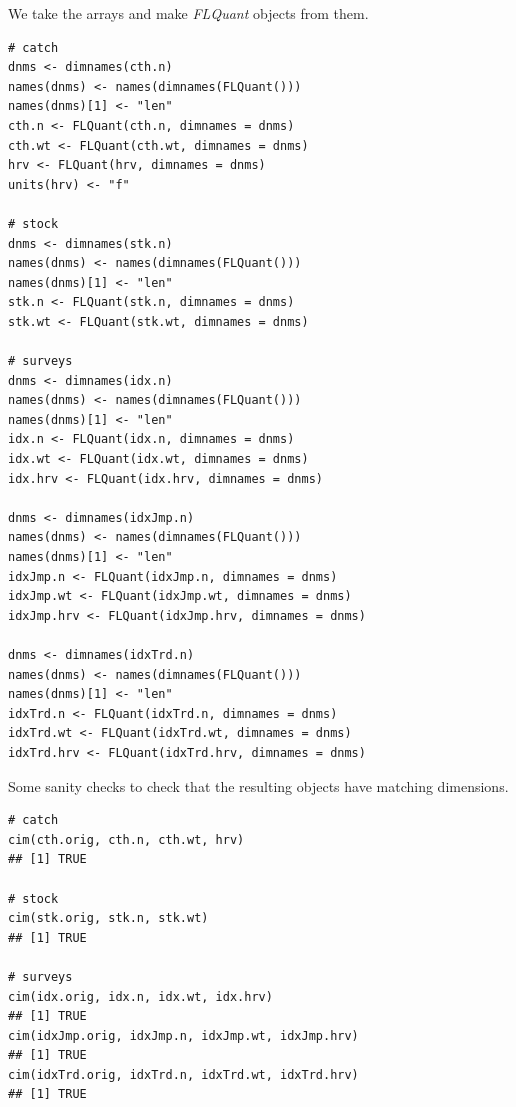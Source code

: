 \documentclass[a4paper,english,10pt]{article}\usepackage[]{graphicx}\usepackage[]{color}
\makeatletter
\newenvironment{kframe}{%
 \def\at@end@of@kframe{}%
 \ifinner\ifhmode%
  \def\at@end@of@kframe{\end{minipage}}%
  \begin{minipage}{\columnwidth}%
 \fi\fi%
 \def\FrameCommand##1{\hskip\@totalleftmargin \hskip-\fboxsep
 \colorbox{shadecolor}{##1}\hskip-\fboxsep
     \hskip-\linewidth \hskip-\@totalleftmargin \hskip\columnwidth}%
 \MakeFramed {\advance\hsize-\width
   \@totalleftmargin\z@ \linewidth\hsize
   \@setminipage}}%
 {\par\unskip\endMakeFramed%
 \at@end@of@kframe}
\newenvironment{knitrout}{}{} %
\newcommand{\class}[1]{{\textit{#1}}}
\makeatother
\begin{document}
We take the arrays and make \class{FLQuant} objects from them.

\begin{knitrout}
\color{fgcolor}\begin{kframe}
\begin{verbatim}
# catch
dnms <- dimnames(cth.n)
names(dnms) <- names(dimnames(FLQuant()))
names(dnms)[1] <- "len"
cth.n <- FLQuant(cth.n, dimnames = dnms)
cth.wt <- FLQuant(cth.wt, dimnames = dnms)
hrv <- FLQuant(hrv, dimnames = dnms)
units(hrv) <- "f"

# stock
dnms <- dimnames(stk.n)
names(dnms) <- names(dimnames(FLQuant()))
names(dnms)[1] <- "len"
stk.n <- FLQuant(stk.n, dimnames = dnms)
stk.wt <- FLQuant(stk.wt, dimnames = dnms)

# surveys
dnms <- dimnames(idx.n)
names(dnms) <- names(dimnames(FLQuant()))
names(dnms)[1] <- "len"
idx.n <- FLQuant(idx.n, dimnames = dnms)
idx.wt <- FLQuant(idx.wt, dimnames = dnms)
idx.hrv <- FLQuant(idx.hrv, dimnames = dnms)

dnms <- dimnames(idxJmp.n)
names(dnms) <- names(dimnames(FLQuant()))
names(dnms)[1] <- "len"
idxJmp.n <- FLQuant(idxJmp.n, dimnames = dnms)
idxJmp.wt <- FLQuant(idxJmp.wt, dimnames = dnms)
idxJmp.hrv <- FLQuant(idxJmp.hrv, dimnames = dnms)

dnms <- dimnames(idxTrd.n)
names(dnms) <- names(dimnames(FLQuant()))
names(dnms)[1] <- "len"
idxTrd.n <- FLQuant(idxTrd.n, dimnames = dnms)
idxTrd.wt <- FLQuant(idxTrd.wt, dimnames = dnms)
idxTrd.hrv <- FLQuant(idxTrd.hrv, dimnames = dnms)
\end{verbatim}
\end{kframe}
\end{knitrout}


Some sanity checks to check that the resulting objects have matching dimensions.

\begin{knitrout}
\color{fgcolor}\begin{kframe}
\begin{verbatim}
# catch
cim(cth.orig, cth.n, cth.wt, hrv)
## [1] TRUE

# stock
cim(stk.orig, stk.n, stk.wt)
## [1] TRUE

# surveys
cim(idx.orig, idx.n, idx.wt, idx.hrv)
## [1] TRUE
cim(idxJmp.orig, idxJmp.n, idxJmp.wt, idxJmp.hrv)
## [1] TRUE
cim(idxTrd.orig, idxTrd.n, idxTrd.wt, idxTrd.hrv)
## [1] TRUE
\end{verbatim}
\end{kframe}
\end{knitrout}
\end{document}
